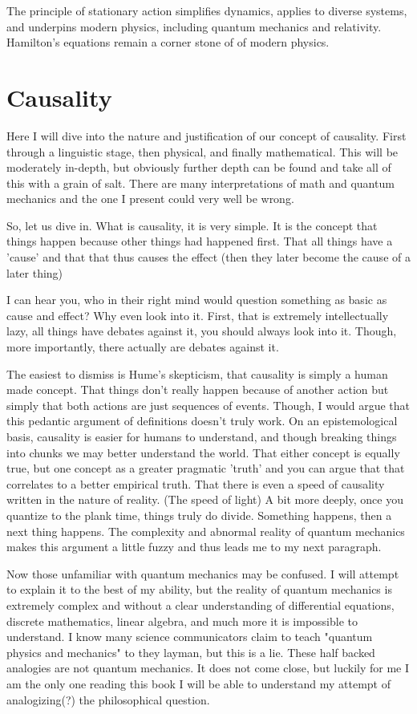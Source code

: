 The principle of stationary action simplifies dynamics, applies to diverse systems, and underpins modern physics, including quantum mechanics and relativity. Hamilton's equations remain a corner stone of of modern physics.
\section{Causality}
Here I will dive into the nature and justification of our concept of causality. First through a linguistic stage, then physical, and finally mathematical. This will be moderately in-depth, but obviously further depth can be found and take all of this with a grain of salt. There are many interpretations of math and quantum mechanics and the one I present could very well be wrong.

So, let us dive in. What is causality, it is very simple. It is the concept that things happen because other things had happened first. That all things have a 'cause' and that that thus causes the effect (then they later become the cause of a later thing)

I can hear you, who in their right mind would question something as basic as cause and effect? Why even look into it. First, that is extremely intellectually lazy, all things have debates against it, you should always look into it. Though, more importantly, there actually are debates against it.

The easiest to dismiss is Hume's skepticism, that causality is simply a human made concept. That things don't really happen because of another action but simply that both actions are just sequences of events. Though, I would argue that this pedantic argument of definitions doesn't truly work. On an epistemological basis, causality is easier for humans to understand, and though breaking things into chunks we may better understand the world. That either concept is equally true, but one concept as a greater pragmatic 'truth' and you can argue that that correlates to a better empirical truth. That there is even a speed of causality written in the nature of reality. (The speed of light) A bit more deeply, once you quantize to the plank time, things truly do divide. Something happens, then a next thing happens. The complexity and abnormal reality of quantum mechanics makes this argument a little fuzzy and thus leads me to my next paragraph.

Now those unfamiliar with quantum mechanics may be confused. I will attempt to explain it to the best of my ability, but the reality of quantum mechanics is extremely complex and without a clear understanding of differential equations, discrete mathematics, linear algebra, and much more it is impossible to understand. I know many science communicators claim to teach "quantum physics and mechanics" to they layman, but this is a lie. These half backed analogies are not quantum mechanics. It does not come close, but luckily for me I am the only one reading this book I will be able to understand my attempt of analogizing(?) the philosophical question.

